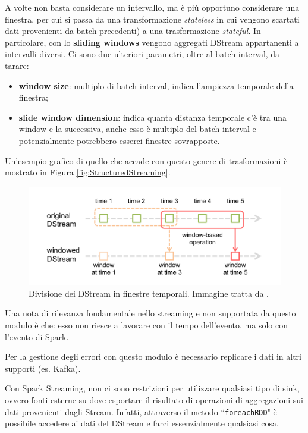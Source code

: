 \documentclass[12pt,italian]{article}
\begin{document}
\par A volte non basta considerare un intervallo, ma è più opportuno considerare una finestra, per cui si passa da una transformazione \textit{stateless} in cui vengono scartati dati provenienti da batch precedenti) a una trasformazione \textit{stateful}. In particolare, con lo \textbf{sliding windows} vengono aggregati DStream appartanenti a intervalli diversi.
Ci sono due ulteriori parametri, oltre al batch interval, da tarare:
\begin{itemize}
	\item \textbf{window size}: multiplo di batch interval, indica l'ampiezza temporale della finestra;
	\item \textbf{slide window dimension}: indica quanta distanza temporale c'è tra una window e la successiva, anche esso è multiplo del batch interval e potenzialmente potrebbero esserci finestre sovrapposte.
\end{itemize}
Un'esempio grafico di quello che accade con questo genere di trasformazioni è mostrato in Figura \ref{fig:StructuredStreaming}.
\begin{figure}[H]
	\centering 
	\includegraphics[width=1\linewidth]{img/sparkStreamingWindow.png}
	\caption{Divisione dei DStream in finestre temporali. Immagine tratta da \cite{spark}.}
	\label{fig:SparkStreamingWindow}
\end{figure}
\par Una nota di rilevanza fondamentale nello streaming e non supportata da questo modulo è che: esso non riesce a lavorare con il tempo dell'evento, ma solo con l'evento di Spark.
\par Per la gestione degli errori con questo modulo è necessario replicare i dati in altri supporti (es. Kafka).
\par Con Spark Streaming, non ci sono restrizioni per utilizzare qualsiasi tipo di sink, ovvero fonti esterne su dove esportare il risultato di operazioni di aggregazioni sui dati provenienti dagli Stream. Infatti, attraverso il metodo ``\texttt{foreachRDD}" è possibile accedere ai dati del DStream e farci essenzialmente qualsiasi cosa. 
\end{document}
